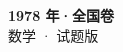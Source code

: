 \documentclass[zihao=-4, a4paper]{ctexart}
\begin{document}
\begin{center}
  {\Large\bfseries 1978 年·全国卷}\\[4pt]
  {\large 数学 · 试题版}
\end{center}
\medskip
{}

\end{document}
